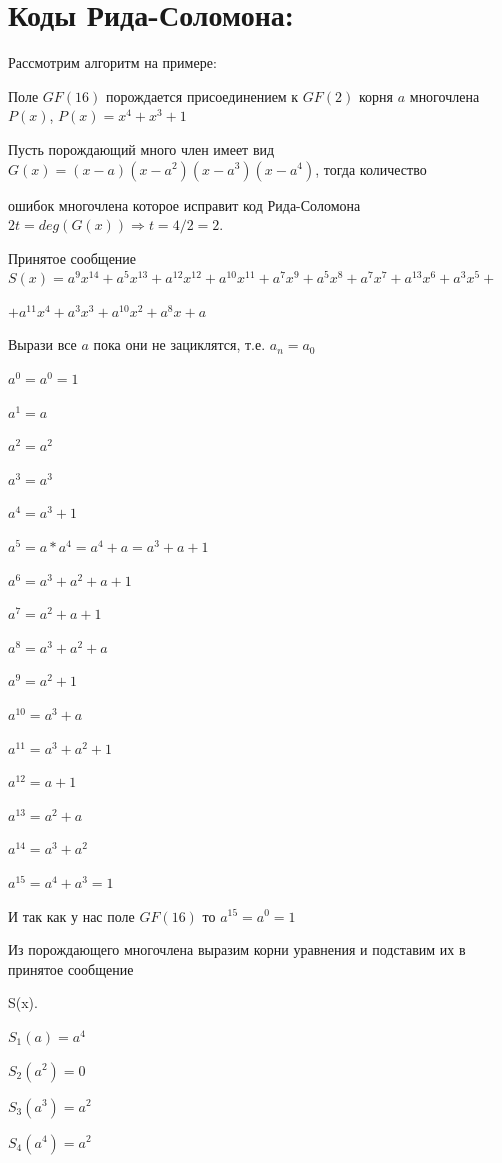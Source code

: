 \documentclass[12pt]{article}
\begin{document}
\section{Коды Рида-Соломона:}
Рассмотрим алгоритм на примере:\par
Поле $GF(16)$ порождается присоединением к $GF(2)$ корня $a$ многочлена $P(x)$, $P(x) = x^{4}+x^{3}+1$\par
Пусть порождающий много член имеет вид $G(x) = (x-a)(x-a^2)(x-a^3)(x-a^4)$, тогда количество\par
ошибок многочлена которое исправит код Рида-Соломона $2t = deg(G(x)) \Rightarrow t = 4/2 = 2.$\par
Принятое сообщение $S(x) = a^{9}x^14 + a^5x^{13} + a^{12}x^{12} + a^{10}x^{11} + a^7x^9 + a^5x^8 + a^7x^7 + a^{13}x^6 + a^3x^5 +$\par $+ a^{11}x^4 + a^3x^3 + a^{10}x^2 + a^8x + a$\par
Вырази все $a$ пока они не зациклятся, т.е. $a_{n} = a_{0}$\par
$a^{0} = a^{0} = 1$\par
$a^{1} = a$\par
$a^{2} = a^2$\par
$a^{3} = a^3$\par
$a^{4} = a^3+1$\par
$a^{5} = a*a^{4} = a^{4}+a = a^3 + a +1$\par
$a^{6} = a^{3} + a^{2} + a + 1$\par
$a^{7} = a^2 + a + 1$\par
$a^{8} = a^3 + a^2 + a$\par
$a^{9} = a^2 + 1$\par
$a^{10} = a^3 + a$\par
$a^{11} = a^3 + a^2 +1$\par
$a^{12} = a + 1$\par
$a^{13} = a^2 + a$\par
$a^{14} = a^3 + a^2$\par
$a^{15} = a^4 + a^3 = 1$\par
И так как у нас поле $GF(16)$ то $a^{15} = a^{0} = 1$\par
Из порождающего многочлена выразим корни уравнения и подставим их в принятое сообщение\par S(x).\par
$S_1(a) = a^4$\par
$S_2(a^2) = 0$\par
$S_3(a^3) = a^2$\par
$S_4(a^4) = a^2$\par
\end{document}
